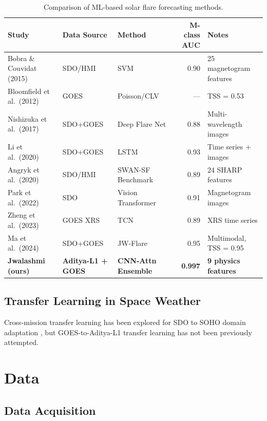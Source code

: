 \documentclass[twocolumn,10pt]{article}
\begin{document}
\begin{table}[htbp]
\centering
\caption{Comparison of ML-based solar flare forecasting methods.}
\label{tab:related}
\footnotesize
\begin{tabular}{@{}lllrl@{}}
\toprule
Study & Data Source & Method & M-class AUC & Notes \\
\midrule
Bobra \& Couvidat (2015) & SDO/HMI & SVM & 0.90 & 25 magnetogram features \\
Bloomfield et al.\ (2012) & GOES & Poisson/CLV & --- & TSS = 0.53 \\
Nishizuka et al.\ (2017) & SDO+GOES & Deep Flare Net & 0.88 & Multi-wavelength images \\
Li et al.\ (2020) & SDO+GOES & LSTM & 0.93 & Time series + images \\
Angryk et al.\ (2020) & SDO/HMI & SWAN-SF Benchmark & 0.89 & 24 SHARP features \\
Park et al.\ (2022) & SDO & Vision Transformer & 0.91 & Magnetogram images \\
Zheng et al.\ (2023) & GOES XRS & TCN & 0.89 & XRS time series \\
Ma et al.\ (2024) & SDO+GOES & JW-Flare & 0.95 & Multimodal, TSS = 0.95 \\
\midrule
\textbf{Jwalashmi (ours)} & \textbf{Aditya-L1 + GOES} & \textbf{CNN-Attn Ensemble} & \textbf{0.997} & \textbf{9 physics features} \\
\bottomrule
\end{tabular}
\end{table}

\subsection{Transfer Learning in Space Weather}

Cross-mission transfer learning has been explored for SDO to SOHO domain adaptation \citep{galvez2019}, but GOES-to-Aditya-L1 transfer learning has not been previously attempted.


\section{Data}\label{sec:data}

\subsection{Data Acquisition}
\end{document}
